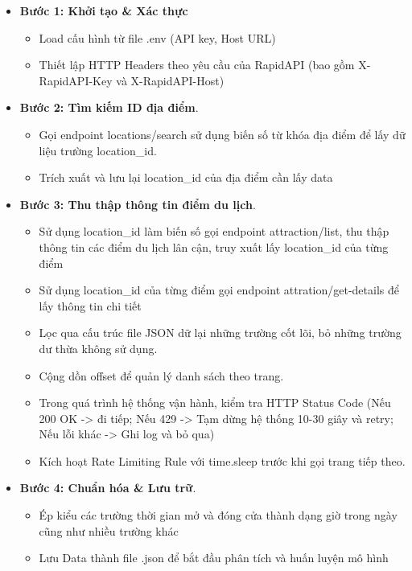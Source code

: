 \begin{itemize}
    \item \textbf{Bước 1: Khởi tạo \& Xác thực}
    \begin{itemize}
        \item Load cấu hình từ file .env (API key, Host URL)
        \item Thiết lập HTTP Headers theo yêu cầu của RapidAPI (bao gồm X-RapidAPI-Key và X-RapidAPI-Host)
    \end{itemize}
    \item \textbf{Bước 2: Tìm kiếm ID địa điểm}. 
    \begin{itemize}
        \item Gọi endpoint locations/search sử dụng biến số từ khóa địa điểm để lấy dữ liệu trường location\_id.
        \item Trích xuất và lưu lại location\_id của địa điểm cần lấy data
    \end{itemize}
    \item \textbf{Bước 3: Thu thập thông tin điểm du lịch}. 
    \begin{itemize}
        \item Sử dụng location\_id làm biến số gọi endpoint attraction/list, thu thập thông tin các điểm du lịch lân cận, truy xuất lấy location\_id của từng điểm
        \item Sử dụng location\_id của từng điểm gọi endpoint attration/get-details để lấy thông tin chi tiết
        \item Lọc qua cấu trúc file JSON dữ lại những trường cốt lõi, bỏ những trường dư thừa không sử dụng.
        \item Cộng dồn offset để quản lý danh sách theo trang.
        \item Trong quá trình hệ thống vận hành, kiểm tra HTTP Status Code (Nếu 200 OK -> đi tiếp; Nếu 429 -> Tạm dừng hệ thống 10-30 giây và retry; Nếu lỗi khác -> Ghi log và bỏ qua)
        \item Kích hoạt Rate Limiting Rule với time.sleep trước khi gọi trang tiếp theo.
    \end{itemize}
    \item \textbf{Bước 4: Chuẩn hóa \& Lưu trữ}. 
    \begin{itemize}
        \item Ép kiểu các trường thời gian mở và đóng cửa thành dạng giờ trong ngày cũng như nhiều trường khác
        \item Lưu Data thành file .json để bắt đầu phân tích và huấn luyện mô hình
    \end{itemize}
\end{itemize}
